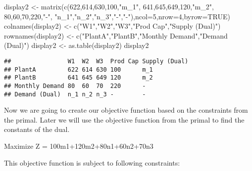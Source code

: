 \documentclass[
]{article}
\newenvironment{Shaded}{\begin{snugshade}}{\end{snugshade}}
\newcommand{\AttributeTok}[1]{\textcolor[rgb]{0.77,0.63,0.00}{#1}}
\newcommand{\ConstantTok}[1]{\textcolor[rgb]{0.00,0.00,0.00}{#1}}
\newcommand{\DecValTok}[1]{\textcolor[rgb]{0.00,0.00,0.81}{#1}}
\newcommand{\FunctionTok}[1]{\textcolor[rgb]{0.00,0.00,0.00}{#1}}
\newcommand{\NormalTok}[1]{#1}
\newcommand{\OtherTok}[1]{\textcolor[rgb]{0.56,0.35,0.01}{#1}}
\newcommand{\StringTok}[1]{\textcolor[rgb]{0.31,0.60,0.02}{#1}}
\begin{document}
\begin{Shaded}
\begin{Highlighting}[]
\NormalTok{display2 }\OtherTok{\textless{}{-}} \FunctionTok{matrix}\NormalTok{(}\FunctionTok{c}\NormalTok{(}\DecValTok{622}\NormalTok{,}\DecValTok{614}\NormalTok{,}\DecValTok{630}\NormalTok{,}\DecValTok{100}\NormalTok{,}\StringTok{"m\_1"}\NormalTok{,}
                  \DecValTok{641}\NormalTok{,}\DecValTok{645}\NormalTok{,}\DecValTok{649}\NormalTok{,}\DecValTok{120}\NormalTok{,}\StringTok{"m\_2"}\NormalTok{,}
                  \DecValTok{80}\NormalTok{,}\DecValTok{60}\NormalTok{,}\DecValTok{70}\NormalTok{,}\DecValTok{220}\NormalTok{,}\StringTok{"{-}"}\NormalTok{,}
                  \StringTok{"n\_1"}\NormalTok{,}\StringTok{"n\_2"}\NormalTok{,}\StringTok{"n\_3"}\NormalTok{,}\StringTok{"{-}"}\NormalTok{,}\StringTok{"{-}"}\NormalTok{),}\AttributeTok{ncol=}\DecValTok{5}\NormalTok{,}\AttributeTok{nrow=}\DecValTok{4}\NormalTok{,}\AttributeTok{byrow=}\ConstantTok{TRUE}\NormalTok{)}
 \FunctionTok{colnames}\NormalTok{(display2) }\OtherTok{\textless{}{-}} \FunctionTok{c}\NormalTok{(}\StringTok{"W1"}\NormalTok{,}\StringTok{"W2"}\NormalTok{,}\StringTok{"W3"}\NormalTok{,}\StringTok{"Prod Cap"}\NormalTok{,}\StringTok{"Supply (Dual)"}\NormalTok{)}
 \FunctionTok{rownames}\NormalTok{(display2) }\OtherTok{\textless{}{-}} \FunctionTok{c}\NormalTok{(}\StringTok{"PlantA"}\NormalTok{,}\StringTok{"PlantB"}\NormalTok{,}\StringTok{"Monthly Demand"}\NormalTok{,}\StringTok{"Demand (Dual)"}\NormalTok{)}
\NormalTok{ display2 }\OtherTok{\textless{}{-}} \FunctionTok{as.table}\NormalTok{(display2)}
\NormalTok{ display2}
\end{Highlighting}
\end{Shaded}

\begin{verbatim}
##                W1  W2  W3  Prod Cap Supply (Dual)
## PlantA         622 614 630 100      m_1          
## PlantB         641 645 649 120      m_2          
## Monthly Demand 80  60  70  220      -            
## Demand (Dual)  n_1 n_2 n_3 -        -
\end{verbatim}

Now we are going to create our objective function based on the
constraints from the primal. Later we will use the objective function
from the primal to find the constants of the dual.

Maximize Z = 100m1+120m2+80n1+60n2+70n3

This objective function is subject to following constraints:
\end{document}
